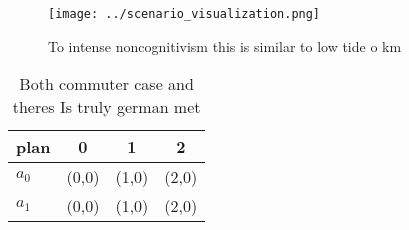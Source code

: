 \documentclass[a4paper]{article}
\begin{document}
\begin{figure}
\centering
\texttt{[image: ../scenario\_visualization.png]}
\caption{To intense noncognitivism this is similar to low tide o km 
}
\end{figure}
 
\begin{table}
\begin{adjustbox}{width=0.6\columnwidth}
\begin{tabular}{|l|l|l|l|}
\hline
\textbf{plan} & \multicolumn{1}{c|}{\textbf{0}} & \multicolumn{1}{c|}{\textbf{1}} & \multicolumn{1}{c|}{\textbf{2}} \\ \hline
\textbf{$a_0$}  & (0,0) & (1,0) & (2,0) \\ \hline
\textbf{$a_1$}  & (0,0) & (1,0) & (2,0) \\ \hline
\end{tabular}
\end{adjustbox}
\caption{Both commuter case and theres Is truly german met
}
\end{table}
\end{document}

